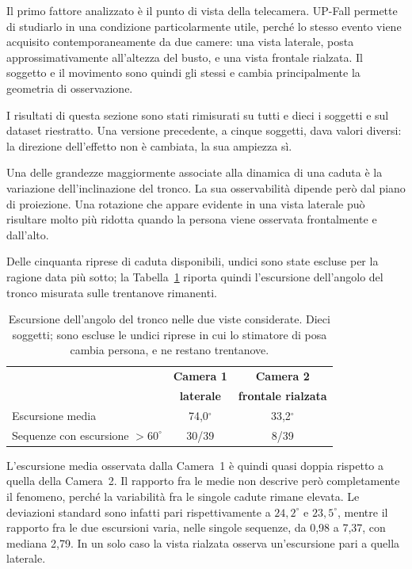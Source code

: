 Il primo fattore analizzato è il punto di vista della telecamera. UP-Fall permette di studiarlo in una condizione particolarmente utile, perché lo stesso evento viene acquisito contemporaneamente da due camere: una vista laterale, posta approssimativamente all'altezza del busto, e una vista frontale rialzata. Il soggetto e il movimento sono quindi gli stessi e cambia principalmente la geometria di osservazione.

I risultati di questa sezione sono stati rimisurati su tutti e dieci i soggetti e sul dataset riestratto. Una versione precedente, a cinque soggetti, dava valori diversi: la direzione dell'effetto non è cambiata, la sua ampiezza sì.

Una delle grandezze maggiormente associate alla dinamica di una caduta è la variazione dell'inclinazione del tronco. La sua osservabilità dipende però dal piano di proiezione. Una rotazione che appare evidente in una vista laterale può risultare molto più ridotta quando la persona viene osservata frontalmente e dall'alto.

Delle cinquanta riprese di caduta disponibili, undici sono state escluse per la ragione data più sotto; la Tabella~\ref{tab:escursione} riporta quindi l'escursione dell'angolo del tronco misurata sulle trentanove rimanenti.

\begin{table}[ht]
\centering
\caption{Escursione dell'angolo del tronco nelle due viste considerate. Dieci
soggetti; sono escluse le undici riprese in cui lo stimatore di posa cambia
persona, e ne restano trentanove.}
\label{tab:escursione}
\begin{tabular}{lcc}
\toprule
 & \textbf{Camera 1} & \textbf{Camera 2} \\
 & \textbf{laterale} & \textbf{frontale rialzata} \\
\midrule
Escursione media & 74,0$^\circ$ & 33,2$^\circ$ \\
Sequenze con escursione $>60^\circ$ & 30/39 & 8/39 \\
\bottomrule
\end{tabular}
\end{table}

L'escursione media osservata dalla Camera~1 è quindi quasi doppia rispetto a quella della Camera~2. Il rapporto fra le medie non descrive però completamente il fenomeno, perché la variabilità fra le singole cadute rimane elevata. Le deviazioni standard sono infatti pari rispettivamente a $24{,}2^\circ$ e $23{,}5^\circ$, mentre il rapporto fra le due escursioni varia, nelle singole sequenze, da 0,98 a 7,37, con mediana 2,79. In un solo caso la vista rialzata osserva un'escursione pari a quella laterale.

